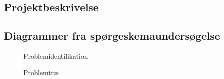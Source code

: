 \documentclass[12pt]{article}
\begin{document}
    \newpage
    \begin{appendices}\newpage
        \renewcommand{\thesubsection}{\Alph{subsection}}
        \subsection{Projektbeskrivelse \label{apx:projektbeskrivels}} \newpage
        \renewcommand*{\thepage}{A\arabic{page}}
        
        \subsection{Diagrammer fra spørgeskemaundersøgelse \label{apx:grafer}} \newpage
        \renewcommand*{\thepage}{B\arabic{page}}
        \begin{figure}[H]
            \centering
            \caption{Problemidentifikation}
        \end{figure}

        \begin{figure}[H]
            \centering
            \caption{Problemtræ}
        \end{figure}


\end{appendices}
\end{document}
